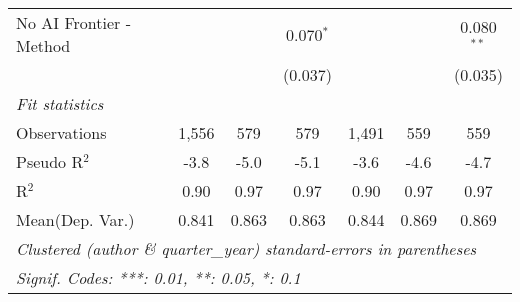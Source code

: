 \begin{tabular}{lcccccc}
   No AI Frontier - Method &             &             & 0.070$^{*}$ &             &             & 0.080$^{**}$\\   
                           &             &             & (0.037)     &             &             & (0.035)\\   
   \midrule
   \emph{Fit statistics}\\
   Observations            & 1,556       & 579         & 579         & 1,491       & 559         & 559\\  
   Pseudo R$^2$            & -3.8        & -5.0        & -5.1        & -3.6        & -4.6        & -4.7\\  
   R$^2$                   & 0.90        & 0.97        & 0.97        & 0.90        & 0.97        & 0.97\\  
Mean(Dep. Var.) & 0.841 & 0.863 & 0.863 & 0.844 & 0.869 & 0.869 \\
   \midrule \midrule
   \multicolumn{7}{l}{\emph{Clustered (author \& quarter\_year) standard-errors in parentheses}}\\
   \multicolumn{7}{l}{\emph{Signif. Codes: ***: 0.01, **: 0.05, *: 0.1}}\\
\end{tabular}
\par\endgroup
